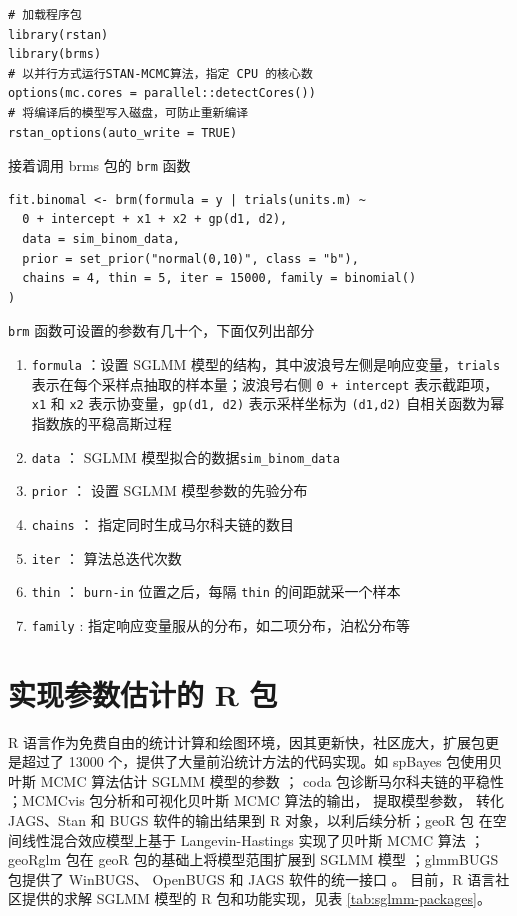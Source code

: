 \documentclass[12pt,a4paper,UTF8,twoside]{book}
\providecommand{\tightlist}{%
  \setlength{\itemsep}{0pt}\setlength{\parskip}{0pt}}
\theoremstyle{definition}
\theoremstyle{definition}
\theoremstyle{definition}
\theoremstyle{remark}
\begin{document}
\begin{verbatim}
# 加载程序包
library(rstan)
library(brms)
# 以并行方式运行STAN-MCMC算法，指定 CPU 的核心数
options(mc.cores = parallel::detectCores())
# 将编译后的模型写入磁盘，可防止重新编译
rstan_options(auto_write = TRUE)
\end{verbatim}

\noindent 接着调用 brms 包的 \texttt{brm} 函数

\begin{verbatim}
fit.binomal <- brm(formula = y | trials(units.m) ~ 
  0 + intercept + x1 + x2 + gp(d1, d2), 
  data = sim_binom_data,
  prior = set_prior("normal(0,10)", class = "b"),
  chains = 4, thin = 5, iter = 15000, family = binomial()
)    
\end{verbatim}

\texttt{brm} 函数可设置的参数有几十个，下面仅列出部分

\begin{enumerate}
\def\labelenumi{\arabic{enumi}.}
\tightlist
\item
  \texttt{formula} ：设置 SGLMM
  模型的结构，其中波浪号左侧是响应变量，\texttt{trials}
  表示在每个采样点抽取的样本量；波浪号右侧 \texttt{0\ +\ intercept}
  表示截距项， \texttt{x1} 和 \texttt{x2}
  表示协变量，\texttt{gp(d1,\ d2)} 表示采样坐标为 \texttt{(d1,d2)}
  自相关函数为幂指数族的平稳高斯过程
\item
  \texttt{data} ： SGLMM 模型拟合的数据\texttt{sim\_binom\_data}
\item
  \texttt{prior} ： 设置 SGLMM 模型参数的先验分布
\item
  \texttt{chains} ： 指定同时生成马尔科夫链的数目
\item
  \texttt{iter} ： 算法总迭代次数
\item
  \texttt{thin} ： \texttt{burn-in} 位置之后，每隔 \texttt{thin}
  的间距就采一个样本
\item
  \texttt{family} : 指定响应变量服从的分布，如二项分布，泊松分布等
\end{enumerate}

\hypertarget{subsec:sglmm-with-r}{%
\section{实现参数估计的 R 包}\label{subsec:sglmm-with-r}}

R
语言作为免费自由的统计计算和绘图环境，因其更新快，社区庞大，扩展包更是超过了
13000 个，提供了大量前沿统计方法的代码实现。如 spBayes 包使用贝叶斯 MCMC
算法估计 SGLMM 模型的参数 \citep{spBayes2015}； coda
包诊断马尔科夫链的平稳性 \citep{coda2006}；MCMCvis 包分析和可视化贝叶斯
MCMC 算法的输出， 提取模型参数， 转化 JAGS、Stan 和 BUGS
软件的输出结果到 R 对象，以利后续分析；geoR 包
在空间线性混合效应模型上基于 Langevin-Hastings 实现了贝叶斯 MCMC 算法
\citep{geoR2001}；geoRglm 包在 geoR 包的基础上将模型范围扩展到 SGLMM
模型 \citep{geoRglm2002}；glmmBUGS 包提供了 WinBUGS、 OpenBUGS 和 JAGS
软件的统一接口 \citep{glmmBUGS2010MCMC}。 目前，R 语言社区提供的求解
SGLMM 模型的 R 包和功能实现，见表 \ref{tab:sglmm-packages}。
\end{document}

